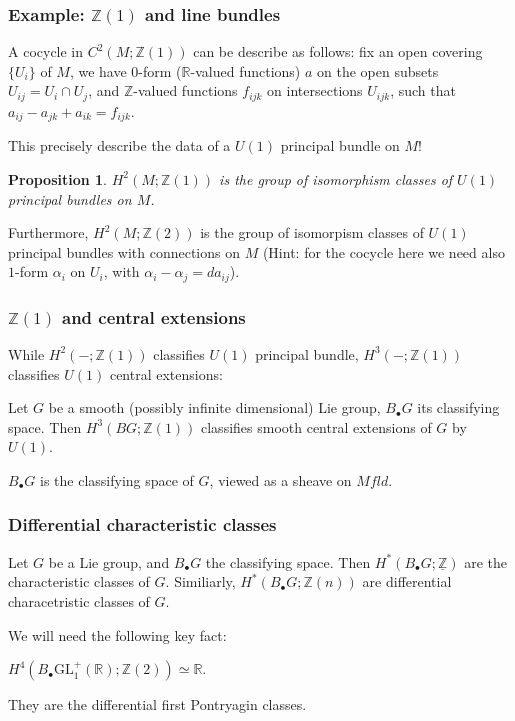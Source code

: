\documentclass{beamer}
\newcommand{\Z}{\mathbb Z}
\newcommand{\R}{\mathbb R}
\newcommand{\GL}{\mathrm{GL}}
\newcommand{\Bdot}{B_\bullet}
\newcommand{\BdotG}{B_\bullet G}
\newtheorem{prop}[equation]{Proposition}
\begin{document}
\begin{frame}
    \frametitle{Example: $\Z(1)$ and line bundles}
    A cocycle in $C^2(M; \Z(1))$ can be describe as follows:
    fix an open covering $\{U_i\}$ of $M$, we have $0$-form ($\R$-valued functions) $a$ on 
    the open subsets $U_{ij} = U_i \cap U_j$, and $\Z$-valued functions $f_{ijk}$ on intersections $U_{ijk}$, such that 
    $a_{ij} - a_{jk} + a_{ik} = f_{ijk}.$\pause \vspace{5mm}

    This precisely describe the data of a $U(1)$ principal bundle on $M$!
    \begin{prop}
        $H^2(M; \Z(1))$ is the group of isomorphism classes of $U(1)$ principal bundles on $M$.
    \end{prop}

    Furthermore, $H^2(M; \Z(2))$ is the group of isomorpism classes of $U(1)$ principal bundles with connections on $M$ 
    (Hint: for the cocycle here we need also $1$-form $\alpha_i$ on $U_i$, with $\alpha_i - \alpha_j = d a_{ij}$).
\end{frame}

\begin{frame}
    \frametitle{$\Z(1)$ and central extensions}
    While $H^2(-; \Z(1))$ classifies $U(1)$ principal bundle, $H^3(-; \Z(1))$ classifies 
    $U(1)$ central extensions: \pause

    \begin{theorem}
        Let $G$ be a smooth (possibly infinite dimensional) Lie group, $\BdotG$ 
        its classifying space. Then 
        $H^3(BG; \Z(1))$ classifies smooth central extensions of $G$ by $U(1)$.
    \end{theorem} \pause 

    $\BdotG$ is the classifying space of $G$, viewed as a sheave on $Mfld$.

\end{frame}

\begin{frame}
    \frametitle{Differential characteristic classes}
    Let $G$ be a Lie group, and $\Bdot G$ the classifying space. Then $H^*(\Bdot G; \underline{\Z})$ 
    are the characteristic classes of $G$. Similiarly, $H^*(\Bdot G; \Z(n))$ are differential 
    characetristic classes of $G$. \pause \vspace{5mm}

    We will  need the following key fact:
    \begin{theorem}
        $H^4(\Bdot\GL_1^+(\R); \Z(2)) \simeq \R$.
    \end{theorem} \pause \vspace{5mm}

    They are the differential first Pontryagin classes.
\end{frame}
\end{document}

